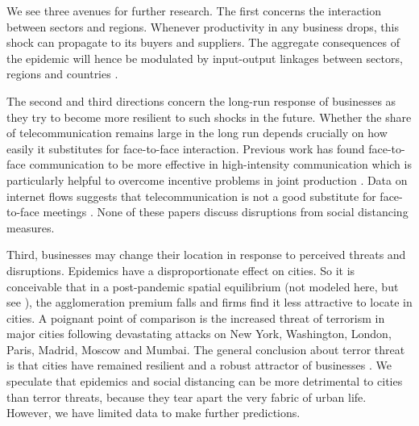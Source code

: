 \documentclass[10pt,letterpaper]{article}
\begin{document}
We see three avenues for further research. The first concerns the interaction between sectors and regions. Whenever productivity in any business drops, this shock can propagate to its buyers and suppliers. The aggregate consequences of the epidemic will hence be modulated by input-output linkages between sectors, regions and countries \cite{Caliendo2014-mr,Caselli2020-nf,Baldwin2020-wb,Barrot2020-jf}.

The second and third directions concern the long-run response of businesses as they try to become more resilient to such shocks in the future. Whether the share of telecommunication remains large in the long run depends crucially on how easily it substitutes for face-to-face interaction. Previous work has found face-to-face communication to be more effective in high-intensity communication which is particularly helpful to overcome incentive problems in joint production \cite{Gaspar1998-gy,Storper2004-mg}. Data on internet flows suggests that telecommunication is not a good substitute for face-to-face meetings \cite{Cuberes2013-js}. None of these papers discuss disruptions from social distancing measures. 

Third, businesses may change their location in response to perceived threats and disruptions. Epidemics have a disproportionate effect on cities. So it is conceivable that in a post-pandemic spatial equilibrium (not modeled here, but see \cite{Tian2019-wq}), the agglomeration premium falls and firms find it less attractive to locate in cities. A poignant point of comparison is the increased threat of terrorism in major cities following devastating attacks on New York, Washington, London, Paris, Madrid, Moscow and Mumbai. The general conclusion about terror threat is that cities have remained resilient and a robust attractor of businesses \cite{Glaeser2002-mw,Harrigan2002-ik}. We speculate that epidemics and social distancing can be more detrimental to cities than terror threats, because they tear apart the very fabric of urban life. However, we have limited data to make further predictions.
\end{document}
